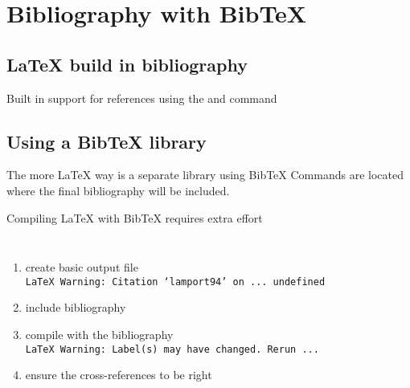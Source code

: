 \section{Bibliography with Bib\TeX{}}

\subsection{{\LaTeX} build in bibliography}
\begin{frame}
	Built in support for references using the  and
	 command
\end{frame}
\begin{frame}
\end{frame}

\subsection{Using a Bib{\TeX} library}
\begin{frame}
	The more {\LaTeX} way is a separate library using {Bib\TeX}
	Commands are located where the final bibliography will be included.
\end{frame}
\begin{frame}
\end{frame}
\begin{frame}
	Compiling {\LaTeX} with {Bib\TeX} requires extra effort
	\begin{columns}[onlytextwidth]
		
			\begin{enumerate}
				\item create basic output file\\
					\texttt{\tiny LaTeX Warning: Citation `lamport94' on ...
					undefined}
				\item include bibliography
				\item compile with the bibliography\\
					\texttt{\tiny LaTeX Warning: Label(s) may have changed. Rerun
					...}
				\item ensure the cross-references to be right
			\end{enumerate}
	\end{columns}
\end{frame}


